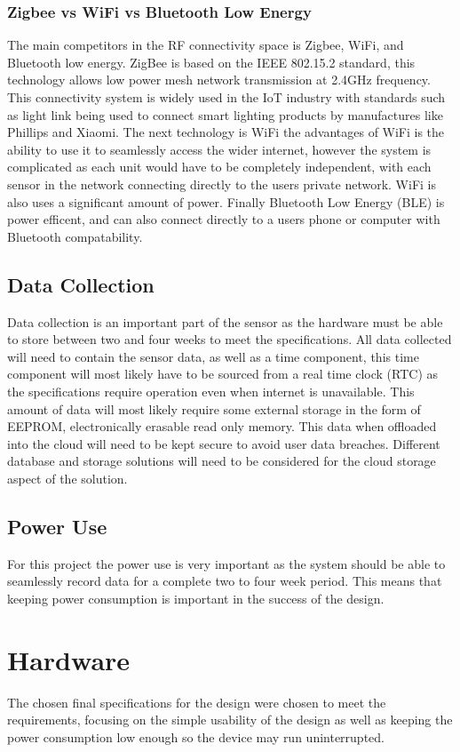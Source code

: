 \documentclass{article}
\begin{document}
\subsubsection{Zigbee vs WiFi vs Bluetooth Low Energy}
The main competitors in the RF connectivity space is Zigbee, WiFi, and Bluetooth low energy.
ZigBee is based on the IEEE 802.15.2 standard, this technology allows low power mesh network 
transmission at 2.4GHz frequency. This connectivity system is widely used in the IoT industry with
standards such as light link being used to connect smart lighting products by manufactures like
Phillips and Xiaomi. The next technology is WiFi the advantages of WiFi is the ability to use it
to seamlessly access the wider internet, however the system is complicated as each unit would have
to be completely independent, with each sensor in the network connecting directly to the users
private network. WiFi is also uses a significant amount of power. Finally Bluetooth Low Energy
(BLE) is power efficent, and can also connect directly to a users phone or computer with Bluetooth
compatability.

\subsection{Data Collection}
Data collection is an important part of the sensor as the hardware must be able to store between
two and four weeks to meet the specifications. All data collected will need to contain the sensor
data, as well as a time component, this time component will most likely have to be sourced from a
real time clock (RTC) as the specifications require operation even when internet is unavailable.
This amount of data will most likely require some external storage in the form of EEPROM,
electronically erasable read only memory. This data when offloaded into the cloud will need to be
kept secure to avoid user data breaches. Different database and storage solutions will need to be
considered for the cloud storage aspect of the solution.

\subsection{Power Use}
For this project the power use is very important as the system should be able to seamlessly
record data for a complete two to four week period. This means that keeping power consumption is
important in the success of the design.

\section{Hardware}
The chosen final specifications for the design were chosen to meet the requirements, focusing on
the simple usability of the design as well as keeping the power consumption low enough so the
device may run uninterrupted.
\end{document}
